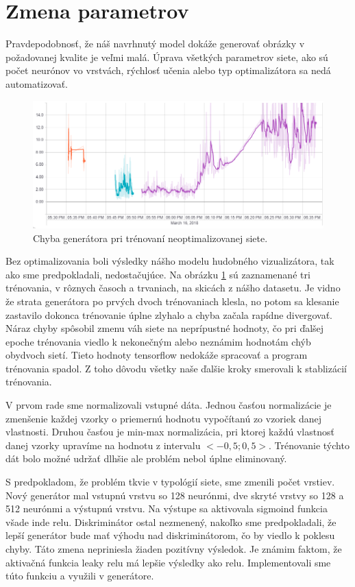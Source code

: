 \section{Zmena parametrov}
Pravdepodobnosť, že náš navrhnutý model dokáže generovať obrázky v požadovanej kvalite je veľmi malá.
Úprava všetkých parametrov siete, ako sú počet neurónov vo vrstvách, rýchlosť učenia alebo typ optimalizátora sa nedá automatizovať. 
\begin{figure}[!ht] 
	\centering 
	\includegraphics[width=.8\textwidth]{figures/g_loss_1} 
	\caption{Chyba generátora pri trénovaní neoptimalizovanej siete.} 
	\label{g_loss_1}
\end{figure}

Bez optimalizovania boli výsledky nášho modelu hudobného vizualizátora, tak ako sme predpokladali, nedostačujúce.
Na obrázku \ref{g_loss_1} sú zaznamenané tri trénovania, v rôznych časoch a trvaniach, na skicách z nášho datasetu.
Je vidno že strata generátora po prvých dvoch trénovaniach klesla, no potom sa klesanie zastavilo dokonca trénovanie úplne zlyhalo a chyba začala rapídne divergovať.
Náraz chyby spôsobil zmenu váh siete na neprípustné hodnoty, čo pri ďalšej epoche trénovania viedlo k nekonečným alebo neznámim hodnotám chýb obydvoch sietí.
Tieto hodnoty tensorflow nedokáže spracovať a program trénovania spadol.
Z toho dôvodu všetky naše ďalšie kroky smerovali k stablizácií trénovania.

V prvom rade sme normalizovali vstupné dáta.
Jednou časťou normalizácie je zmenšenie každej vzorky  o priemernú hodnotu vypočítanú zo vzoriek danej vlastnosti.
Druhou časťou je min-max normalizácia, pri ktorej každú vlastnosť danej vzorky upravíme na hodnotu z intervalu \(<-0,5; 0,5>\).
Trénovanie týchto dát bolo možné udržať dlhšie ale problém nebol úplne eliminovaný.

S predpokladom, že problém tkvie v typológií siete, sme zmenili počet vrstiev.
Nový generátor mal vstupnú vrstvu so 128 neurónmi, dve skryté vrstvy so 128 a 512 neurónmi a výstupnú vrstvu.
Na výstupe sa aktivovala sigmoind funkcia všade inde relu.
Diskriminátor ostal nezmenený, nakoľko sme predpokladali, že lepší generátor bude mať výhodu nad diskriminátorom, čo by viedlo k poklesu chyby.
Táto zmena nepriniesla žiaden pozitívny výsledok.
Je známim faktom, že aktivačná funkcia leaky relu má lepšie výsledky ako relu.
Implementovali sme túto funkciu a využili v generátore.

